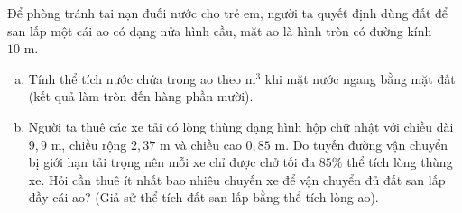 \begin{bt}%
Để phòng tránh tai nạn đuối nước cho trẻ em, người ta quyết định dùng đất để san lấp một cái ao có dạng nửa hình cầu, mặt ao là hình tròn có đường kính $10\text{ m}$.
\begin{enumerate}[a)]
    \item Tính thể tích nước chứa trong ao theo $\text{m}^3$ khi mặt nước ngang bằng mặt đất (kết quả làm tròn đến hàng phần mười).
    \item Người ta thuê các xe tải có lòng thùng dạng hình hộp chữ nhật với chiều dài $9{,}9\text{ m}$, chiều rộng $2{,}37\text{ m}$ và chiều cao $0{,}85\text{ m}$. Do tuyến đường vận chuyển bị giới hạn tải trọng nên mỗi xe chỉ được chở tối đa $85\%$ thể tích lòng thùng xe. Hỏi cần thuê ít nhất bao nhiêu chuyến xe để vận chuyển đủ đất san lấp đầy cái ao? (Giả sử thể tích đất san lấp bằng thể tích lòng ao).
\end{enumerate}
\end{bt}

